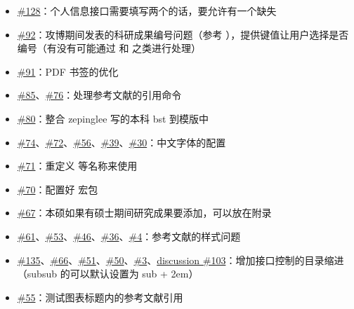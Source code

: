 \begin{itemize}
  \item \href{https://github.com/whutug/whu-thesis/issues/128}{\#128}：个人信息接口需要填写两个的话，要允许有一个缺失
  \item \href{https://github.com/whutug/whu-thesis/issues/92}{\#92}：攻博期间发表的科研成果编号问题（参考 ），提供键值让用户选择是否编号（有没有可能通过  和  之类进行处理）
  \item \href{https://github.com/whutug/whu-thesis/issues/91}{\#91}：PDF 书签的优化
  \item \href{https://github.com/whutug/whu-thesis/issues/85}{\#85}、\href{https://github.com/whutug/whu-thesis/issues/76}{\#76}：处理参考文献的引用命令
  \item \href{https://github.com/whutug/whu-thesis/issues/80}{\#80}：整合 zepinglee 写的本科 bst 到模版中
  \item \href{https://github.com/whutug/whu-thesis/issues/74}{\#74}、\href{https://github.com/whutug/whu-thesis/issues/72}{\#72}、\href{https://github.com/whutug/whu-thesis/issues/56}{\#56}、\href{https://github.com/whutug/whu-thesis/issues/39}{\#39}、\href{https://github.com/whutug/whu-thesis/issues/30}{\#30}：中文字体的配置
  \item \href{https://github.com/whutug/whu-thesis/issues/71}{\#71}：重定义  等名称来使用 
  \item \href{https://github.com/whutug/whu-thesis/issues/70}{\#70}：配置好  宏包
  \item \href{https://github.com/whutug/whu-thesis/issues/67}{\#67}：本硕如果有硕士期间研究成果要添加，可以放在附录
  \item \href{https://github.com/whutug/whu-thesis/issues/61}{\#61}、\href{https://github.com/whutug/whu-thesis/issues/53}{\#53}、\href{https://github.com/whutug/whu-thesis/issues/46}{\#46}、\href{https://github.com/whutug/whu-thesis/issues/36}{\#36}、\href{https://github.com/whutug/whu-thesis/issues/4}{\#4}：参考文献的样式问题
  \item \href{https://github.com/whutug/whu-thesis/issues/135}{\#135}、\href{https://github.com/whutug/whu-thesis/issues/66}{\#66}、\href{https://github.com/whutug/whu-thesis/issues/51}{\#51}、\href{https://github.com/whutug/whu-thesis/issues/50}{\#50}、\href{https://github.com/whutug/whu-thesis/issues/3}{\#3}、\href{https://github.com/whutug/whu-thesis/discussions/103}{discussion \#103}：增加接口控制的目录缩进（subsub 的可以默认设置为 sub + 2em）
  \item \href{https://github.com/whutug/whu-thesis/issues/55}{\#55}：测试图表标题内的参考文献引用

\end{itemize}

